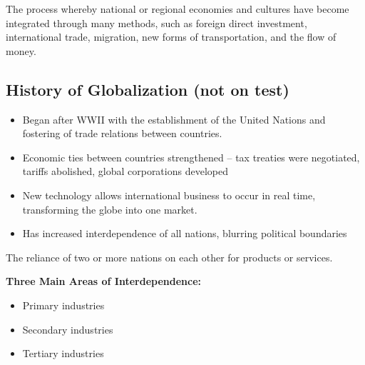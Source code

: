 
\begin{definition}[Globalization]
The process whereby national or regional economies and 
cultures have become integrated through many methods,
such as foreign direct investment, international trade, migration, 
new forms of transportation, and the flow of money. 
\end{definition}

\subsection{History of Globalization (not on test)}
\begin{itemize}
    \item Began after WWII with the establishment of the United Nations and fostering of trade relations between countries.
    \item Economic ties between countries strengthened -- tax treaties were negotiated, tariffs abolished, global corporations developed
    \item New technology allows international business to occur in real time, transforming the globe into one market.
    \item Has increased interdependence of all nations, blurring political boundaries
\end{itemize}

\begin{definition}[Interdependence]
    The reliance of two or more nations on each other for products or services.
\end{definition}

\textbf{Three Main Areas of Interdependence:}
\begin{itemize}
    \item Primary industries
    \item Secondary industries 
    \item Tertiary industries
\end{itemize}

